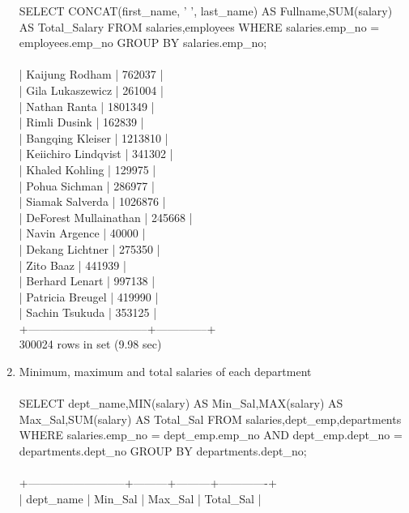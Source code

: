 \documentclass[]{article}
\begin{document}
\begin{enumerate}
SELECT CONCAT(first\_name, ' ', last\_name) AS Fullname,SUM(salary) AS Total\_Salary FROM salaries,employees
WHERE salaries.emp\_no = employees.emp\_no
GROUP BY salaries.emp\_no;
\\\\
| Kaijung Rodham                 |       762037 |
\\
| Gila Lukaszewicz               |       261004 |
\\
| Nathan Ranta                   |      1801349 |
\\
| Rimli Dusink                   |       162839 |
\\
| Bangqing Kleiser               |      1213810 |
\\
| Keiichiro Lindqvist            |       341302 |
\\
| Khaled Kohling                 |       129975 |
\\
| Pohua Sichman                  |       286977 |
\\
| Siamak Salverda                |      1026876 |
\\
| DeForest Mullainathan          |       245668 |
\\
| Navin Argence                  |        40000 |
\\
| Dekang Lichtner                |       275350 |
\\
| Zito Baaz                      |       441939 |
\\
| Berhard Lenart                 |       997138 |
\\
| Patricia Breugel               |       419990 |
\\
| Sachin Tsukuda                 |       353125 |
\\
+--------------------------------+--------------+
\\
300024 rows in set (9.98 sec)
\\
\item Minimum, maximum and total salaries of each department
\\\\
SELECT dept\_name,MIN(salary) AS Min\_Sal,MAX(salary) AS Max\_Sal,SUM(salary) AS Total\_Sal FROM salaries,dept\_emp,departments
WHERE salaries.emp\_no = dept\_emp.emp\_no
AND
dept\_emp.dept\_no = departments.dept\_no
GROUP BY departments.dept\_no;
\\\\
+--------------------------+---------+---------+-------------+
\\
| dept\_name                | Min\_Sal | Max\_Sal | Total\_Sal   |

\end{enumerate}
\end{document}
